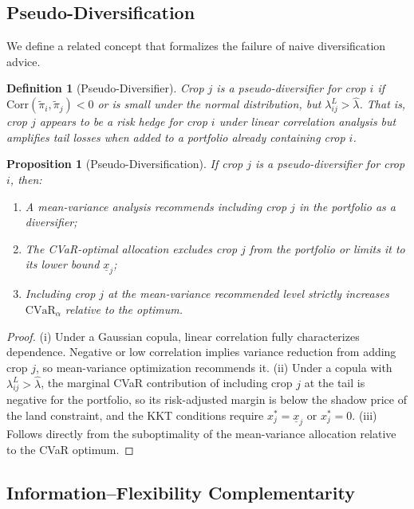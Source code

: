 \documentclass[12pt,review,authoryear]{elsarticle}
\numberwithin{equation}{section}
\newtheorem{definition}{Definition}[section]
\newtheorem{proposition}[theorem]{Proposition}
\begin{document}
\subsection{Pseudo-Diversification}

We define a related concept that formalizes the failure of naive
diversification advice.

\begin{definition}[Pseudo-Diversifier]
\label{def:pseudo}
Crop $j$ is a \emph{pseudo-diversifier} for crop $i$ if $\text{Corr}(\tilde{\pi}_i,
\tilde{\pi}_j) < 0$ or is small under the normal distribution, but
$\lambda_{ij}^L > \hat{\lambda}$.  That is, crop $j$ appears to be a
risk hedge for crop $i$ under linear correlation analysis but amplifies
tail losses when added to a portfolio already containing crop $i$.
\end{definition}

\begin{proposition}[Pseudo-Diversification]
\label{prop:pseudo}
If crop $j$ is a pseudo-diversifier for crop $i$, then:
\begin{enumerate}
\item[(i)] A mean-variance analysis recommends including crop $j$ in the
portfolio as a diversifier;
\item[(ii)] The CVaR-optimal allocation excludes crop $j$ from the
portfolio or limits it to its lower bound $\underline{x}_j$;
\item[(iii)] Including crop $j$ at the mean-variance recommended level
strictly increases $\text{CVaR}_\alpha$ relative to the optimum.
\end{enumerate}
\end{proposition}

\begin{proof}
(i) Under a Gaussian copula, linear correlation fully characterizes
dependence.  Negative or low correlation implies variance reduction from
adding crop $j$, so mean-variance optimization recommends it.  (ii) Under
a copula with $\lambda_{ij}^L > \hat{\lambda}$, the marginal CVaR
contribution of including crop $j$ at the tail is negative for the
portfolio, so its risk-adjusted margin is below the shadow price of the
land constraint, and the KKT conditions require $x_j^* = \underline{x}_j$
or $x_j^* = 0$.  (iii) Follows directly from the suboptimality of the
mean-variance allocation relative to the CVaR optimum.
\end{proof}

\subsection{Information--Flexibility Complementarity}
\end{document}
